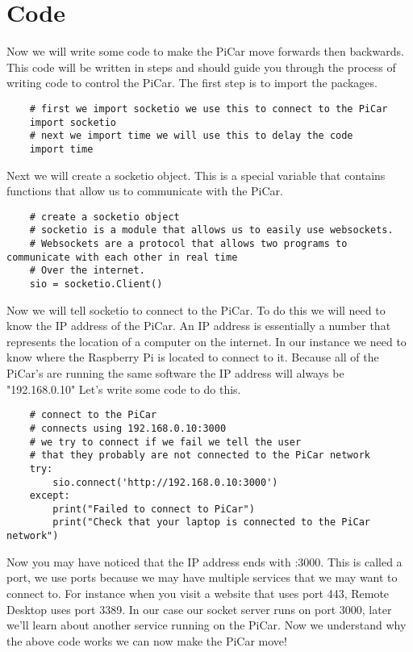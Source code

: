 \documentclass[11pt]{report}
\begin{document}
\section{Code}
Now we will write some code to make the PiCar move forwards then backwards.
This code will be written in steps and should guide you through the process of
writing code to control the PiCar. The first step is to import the packages.
\begin{verbatim}
    # first we import socketio we use this to connect to the PiCar
    import socketio 
    # next we import time we will use this to delay the code
    import time
\end{verbatim}

Next we will create a socketio object. This is a special variable that contains
functions that allow us to communicate with the PiCar.

\begin{verbatim}
    # create a socketio object
    # socketio is a module that allows us to easily use websockets.
    # Websockets are a protocol that allows two programs to communicate with each other in real time
    # Over the internet. 
    sio = socketio.Client()
    \end{verbatim}

Now we will tell socketio to connect to the PiCar. To do this we will need to
know the IP address of the PiCar. An IP address is essentially a number that
represents the location of a computer on the internet. In our instance we need
to know where the Raspberry Pi is located to connect to it. Because all of the
PiCar's are running the same software the IP address will always be
"192.168.0.10" Let's write some code to do this.

\begin{verbatim}
    # connect to the PiCar
    # connects using 192.168.0.10:3000
    # we try to connect if we fail we tell the user 
    # that they probably are not connected to the PiCar network
    try:
        sio.connect('http://192.168.0.10:3000')
    except:
        print("Failed to connect to PiCar")
        print("Check that your laptop is connected to the PiCar network")
    \end{verbatim}

Now you may have noticed that the IP address ends with :3000. This is called a
port, we use ports because we may have multiple services that we may want to
connect to. For instance when you visit a website that uses port 443, Remote
Desktop uses port 3389. In our case our socket server runs on port 3000, later
we'll learn about another service running on the PiCar. Now we understand why
the above code works we can now make the PiCar move!
\end{document}
